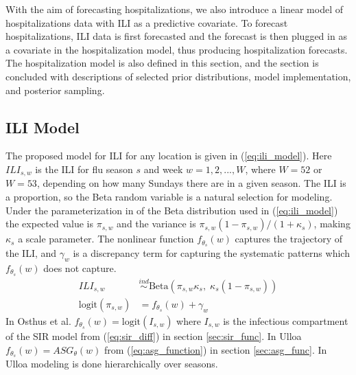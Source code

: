 With the aim of forecasting hospitalizations, we also introduce a linear 
model of hospitalizations data with ILI as a predictive covariate. To forecast 
hospitalizations, ILI data is first forecasted and the forecast is then 
plugged in as a covariate in the hospitalization model, thus producing 
hospitalization forecasts. The hospitalization model is also defined in this 
section, and the section is concluded with descriptions of selected prior 
distributions, model implementation, and posterior sampling.



\subsection{ILI Model} \label{sec:ili_model}

The proposed model for ILI for any location is given in (\ref{eq:ili_model}). 
Here $ILI_{s,w}$ is the ILI for flu season $s$ and week $w = 1, 2, ..., W$, 
where $W = 52$ or $W = 53$, depending on how many Sundays there are in a given 
season. The ILI is a proportion, so the Beta random variable is a natural 
selection for modeling. Under the parameterization in of the Beta distribution 
used in (\ref{eq:ili_model}) the expected value is $\pi_{s,w}$ and the 
variance is $\pi_{s,w}(1 - \pi_{s,w})/(1 + \kappa_s)$, making $\kappa_s$ a 
scale parameter. The nonlinear function $f_{\theta_s}(w)$ captures the 
trajectory of the ILI, and $\gamma_w$ is a discrepancy term for capturing the 
systematic patterns which $f_{\theta_s}(w)$ does not capture. 
\begin{equation}
\begin{aligned}
    \label{eq:ili_model}
        ILI_{s,w} &\overset{ind}{\sim} \text{Beta}(\pi_{s,w}\kappa_s,\; \kappa_s(1 - \pi_{s,w})) \\
        \text{logit}(\pi_{s,w}) &= f_{\theta_s}(w) + \gamma_w
\end{aligned}
\end{equation}
In Osthus et al. \cite[]{osthus2019dynamic} 
$f_{\theta_s}(w) = \text{logit}(I_{s,w})$ where $I_{s,w}$ is the infectious 
compartment of the SIR model from (\ref{eq:sir_diff}) in section 
\ref{sec:sir_func}. In Ulloa \cite[]{ulloa2019} 
$f_{\theta_s}(w) = ASG_{\theta}(w)$ from (\ref{eq:asg_function}) in section 
\ref{sec:asg_func}. In Ulloa \cite[]{ulloa2019} modeling is done hierarchically 
over seasons. 



